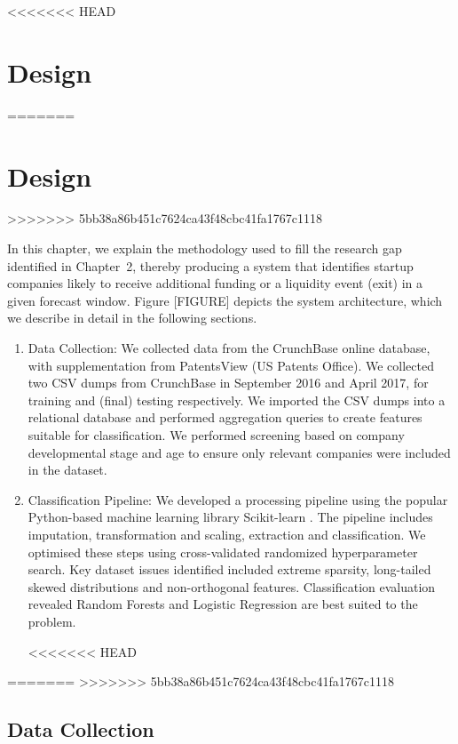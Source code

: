 \documentclass[../thesis/thesis.tex]{subfiles}
\begin{document}
<<<<<<< HEAD

\chapter{Design}
\label{chap:design}
=======
 \chapter{Design}

>>>>>>> 5bb38a86b451c7624ca43f48cbc41fa1767c1118

In this chapter, we explain the methodology used to fill the research gap identified in Chapter~2, thereby producing a system that identifies startup companies likely to receive additional funding or a liquidity event (exit) in a given forecast window. Figure [FIGURE] depicts the system architecture, which we describe in detail in the following sections.

\begin{enumerate}

\item Data Collection: We collected data from the CrunchBase online database, with supplementation from PatentsView (US Patents Office). We collected two CSV dumps from CrunchBase in September 2016 and April 2017, for training and (final) testing respectively. We imported the CSV dumps into a relational database and performed aggregation queries to create features suitable for classification. We performed screening based on company developmental stage and age to ensure only relevant companies were included in the dataset.

\item Classification Pipeline: We developed a processing pipeline using the popular Python-based machine learning library Scikit-learn \cite{pedregosa2011}. The pipeline includes imputation, transformation and scaling, extraction and classification. We optimised these steps using cross-validated randomized hyperparameter search. Key dataset issues identified included extreme sparsity, long-tailed skewed distributions and non-orthogonal features. Classification evaluation revealed Random Forests and Logistic Regression are best suited to the problem.

<<<<<<< HEAD
\end{enumerate}

=======
>>>>>>> 5bb38a86b451c7624ca43f48cbc41fa1767c1118
\section{Data Collection}
\end{document}
